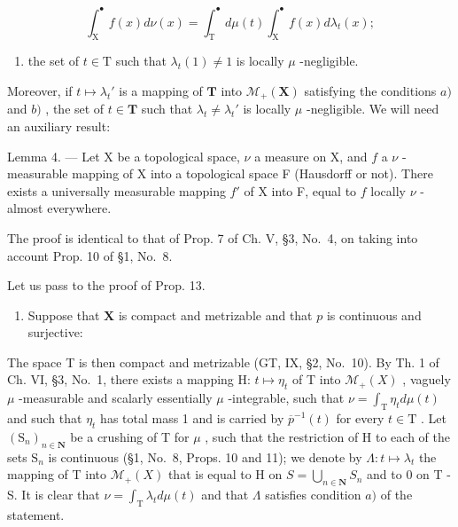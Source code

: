 \[
\int_ {\mathrm{X}} ^ {\bullet} f (x) d \nu (x) = \int_ {\mathrm{T}} ^ {\bullet} d \mu (t) \int_ {\mathrm{X}} ^ {\bullet} f (x) d \lambda_ {t} (x);\tag{12}
\]

\begin{enumerate}
\def\labelenumi{\alph{enumi})}
\setcounter{enumi}{2}
\tightlist
\item
  the set of \(t \in \mathrm{T}\) such that \(\lambda_t(1) \neq 1\) is locally \(\mu\) -negligible.
\end{enumerate}

Moreover, if \(t \mapsto \lambda_t'\) is a mapping of \(\mathbf{T}\) into \(\mathcal{M}_+(\mathbf{X})\) satisfying the conditions \(a)\) and \(b)\) , the set of \(t \in \mathbf{T}\) such that \(\lambda_t \neq \lambda_t'\) is locally \(\mu\) -negligible. We will need an auxiliary result:

Lemma 4. --- Let X be a topological space, \(\nu\) a measure on X, and \(f\) a \(\nu\) -measurable mapping of X into a topological space F (Hausdorff or not). There exists a universally measurable mapping \(f'\) of X into F, equal to \(f\) locally \(\nu\) -almost everywhere.

The proof is identical to that of Prop. 7 of Ch. V, §3, No.~4, on taking into account Prop. 10 of §1, No.~8.

Let us pass to the proof of Prop. 13.

\begin{enumerate}
\def\labelenumi{\Alph{enumi})}
\tightlist
\item
  Suppose that \(\mathbf{X}\) is compact and metrizable and that \(p\) is continuous and surjective:
\end{enumerate}

The space T is then compact and metrizable (GT, IX, §2, No.~10). By Th. 1 of Ch. VI, §3, No.~1, there exists a mapping H: \(t \mapsto \eta_t\) of T into \(\mathcal{M}_+(X)\) , vaguely \(\mu\) -measurable and scalarly essentially \(\mu\) -integrable, such that \(\nu = \int_{\mathrm{T}} \eta_t d\mu(t)\) and such that \(\eta_t\) has total mass 1 and is carried by \(\overline{p}^{-1}(t)\) for every \(t \in \mathrm{T}\) . Let \((\mathrm{S}_n)_{n \in \mathbf{N}}\) be a crushing of T for \(\mu\) , such that the restriction of H to each of the sets \(\mathrm{S}_n\) is continuous (§1, No.~8, Props. 10 and 11); we denote by \(\Lambda: t \mapsto \lambda_t\) the mapping of T into \(\mathcal{M}_+(X)\) that is equal to H on \(S = \bigcup_{n \in \mathbf{N}} S_n\) and to 0 on T - S. It is clear that \(\nu = \int_{\mathrm{T}}\lambda_t d\mu (t)\) and that \(\Lambda\) satisfies condition \(a)\) of the statement.

